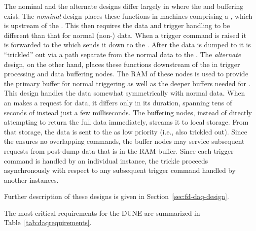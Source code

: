 The nominal and the alternate  designs differ largely in where
the  and  buffering exist. 
The \textit{nominal} design places these functions in machines
comprising a , which is upstream of the . 
This then requires the  data and trigger handling to be
different than that for normal (non-) data. 
When a  trigger command is raised it is forwarded to the
 which sends it down to the . 
After the  data is dumped to  it is
``trickled'' out via a path separate from the normal data to the
. 
%
The \textit{alternate} design, on the other hand, places these
functions downstream of the  in trigger processing and data
buffering nodes.
The RAM of these nodes is used to provide the primary  buffer for
normal triggering as well as the deeper buffers needed for . 
This design handles the  data somewhat
symmetrically with normal data. 
When an  makes a request for  data, it differs
only in its duration, spanning tens of seconds of instead just a few
milliseconds. 
The  buffering nodes, instead of directly attempting to
return the full  data immediately, streams it to local
 storage. 
From that storage, the data is sent to the  as low
priority (i.e., also trickled out).
Since the  ensures no overlapping commands, the buffer
nodes may service subsequent requests from post-dump data that is %
in the RAM buffer.
Since each trigger command is handled by an individual 
instance, the trickle proceeds asynchronously with respect to any subsequent
trigger command handled by another  instances.

Further description of %
these designs
is
given in Section~\ref{sec:fd-daq-design}.


The most critical requirements for the DUNE   
are summarized in Table~\ref{tab:daqrequirements}.

